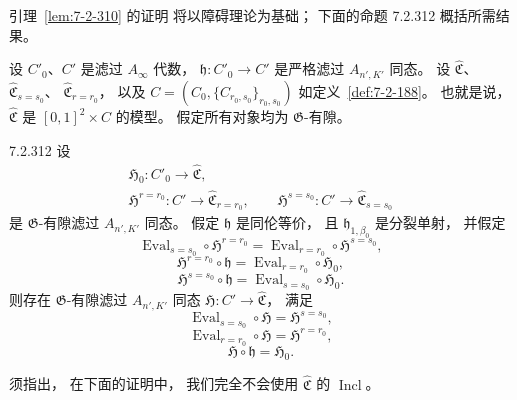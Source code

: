 
引理~\ref{lem:7-2-310} 的证明
将以障碍理论为基础；
下面的命题 7.2.312 概括所需结果。

设 $C'_0$、$C'$ 是滤过
$A_\infty$ 代数，
$\mathfrak h\colon C'_0\to C'$
是严格滤过 $A_{n',K'}$ 同态。
设
$\widehat{\mathfrak C}$、
$\widehat{\mathfrak C}_{s=s_0}$、
$\widehat{\mathfrak C}_{r=r_0}$，
以及
$C=(C_0,\{C_{r_0,s_0}\}_{r_0,s_0})$
如定义~\ref{def:7-2-188}。
也就是说，
$\widehat{\mathfrak C}$
是 $[0,1]^2\times C$ 的模型。
假定所有对象均为 $\mathfrak G$-有隙。

\begin{proposition}{7.2.312}\label{prop:7-2-312}
设
\[
\begin{gathered}
\mathfrak H_0\colon C'_0\longrightarrow
\widehat{\mathfrak C},\\
\mathfrak H^{r=r_0}\colon C'\longrightarrow
\widehat{\mathfrak C}_{r=r_0},\qquad
\mathfrak H^{s=s_0}\colon C'\longrightarrow
\widehat{\mathfrak C}_{s=s_0}
\end{gathered}
\]
是 $\mathfrak G$-有隙滤过
$A_{n',K'}$ 同态。
假定 $\mathfrak h$ 是同伦等价，
且 $\mathfrak h_{1,\beta_0}$ 是分裂单射，
并假定
\begin{equation}
\operatorname{Eval}_{s=s_0}\circ
\mathfrak H^{r=r_0}
=\operatorname{Eval}_{r=r_0}\circ
\mathfrak H^{s=s_0},
\tag{7.2.313.1}\label{eq:7-2-313-1}
\end{equation}
\begin{equation}
\mathfrak H^{r=r_0}\circ\mathfrak h
=\operatorname{Eval}_{r=r_0}\circ\mathfrak H_0,
\tag{7.2.313.2}\label{eq:7-2-313-2}
\end{equation}
\begin{equation}
\mathfrak H^{s=s_0}\circ\mathfrak h
=\operatorname{Eval}_{s=s_0}\circ\mathfrak H_0.
\tag{7.2.313.3}\label{eq:7-2-313-3}
\end{equation}
则存在 $\mathfrak G$-有隙滤过
$A_{n',K'}$ 同态
$\mathfrak H\colon C'\to\widehat{\mathfrak C}$，
满足
\begin{equation}
\operatorname{Eval}_{s=s_0}\circ\mathfrak H
=\mathfrak H^{s=s_0},
\tag{7.2.314.1}\label{eq:7-2-314-1}
\end{equation}
\begin{equation}
\operatorname{Eval}_{r=r_0}\circ\mathfrak H
=\mathfrak H^{r=r_0},
\tag{7.2.314.2}\label{eq:7-2-314-2}
\end{equation}
\begin{equation}
\mathfrak H\circ\mathfrak h=\mathfrak H_0.
\tag{7.2.314.3}\label{eq:7-2-314-3}
\end{equation}
\end{proposition}

须指出，
在下面的证明中，
我们完全不会使用
$\widehat{\mathfrak C}$
的 $\operatorname{Incl}$。
